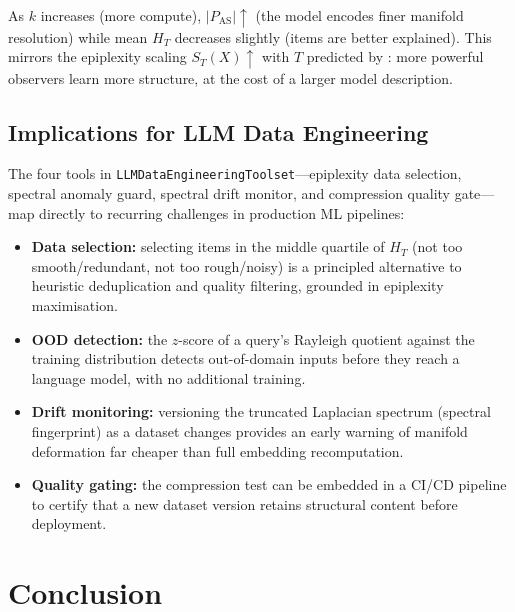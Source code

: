 \documentclass[12pt,a4paper]{article}
\theoremstyle{plain}
\theoremstyle{definition}
\theoremstyle{remark}
\newcommand{\1}{\mathbf{1}}
\begin{document}
	As $k$ increases (more compute), $|P_\mathrm{AS}|\uparrow$ (the model
	encodes finer manifold resolution) while mean $H_T$ decreases slightly
	(items are better explained).
	This mirrors the epiplexity scaling $S_T(X)\uparrow$ with $T$ predicted
	by \cite{finzi2026epiplexity}: more powerful observers learn more
	structure, at the cost of a larger model description.
	
	\subsection{Implications for LLM Data Engineering}
	
	The four tools in \texttt{LLMDataEngineeringToolset}---epiplexity data
	selection, spectral anomaly guard, spectral drift monitor, and
	compression quality gate---map directly to recurring challenges in
	production ML pipelines:
	
	\begin{itemize}
		\item \textbf{Data selection:} selecting items in the middle quartile
		of $H_T$ (not too smooth/redundant, not too rough/noisy) is a
		principled alternative to heuristic deduplication and quality
		filtering, grounded in epiplexity maximisation.
		\item \textbf{OOD detection:} the $z$-score of a query's Rayleigh
		quotient against the training distribution detects out-of-domain
		inputs before they reach a language model, with no additional
		training.
		\item \textbf{Drift monitoring:} versioning the truncated Laplacian
		spectrum (spectral fingerprint) as a dataset changes provides
		an early warning of manifold deformation far cheaper than
		full embedding recomputation.
		\item \textbf{Quality gating:} the compression test can be embedded
		in a CI/CD pipeline to certify that a new dataset version
		retains structural content before deployment.
	\end{itemize}
	
	\section{Conclusion}
	\label{sec:conclusion}
	
\end{document}
